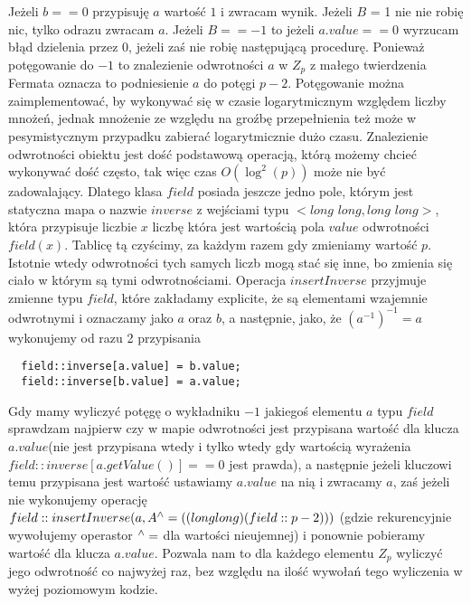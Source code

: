 \documentclass{article}
\begin{document}
Jeżeli $b==0$ przypisuję $a$ wartość $1$ i zwracam wynik. Jeżeli $B$ = 1 nie 
nie robię nic, tylko odrazu zwracam $a$. Jeżeli $B==-1$ to jeżeli $a.value==0$ 
wyrzucam błąd dzielenia przez $0$, jeżeli zaś nie robię następującą procedurę.
Ponieważ potęgowanie do $-1$ to znalezienie odwrotności $a$ w $Z_p$
z małego twierdzenia Fermata oznacza to podniesienie $a$ do potęgi 
$p-2$. Potęgowanie można zaimplementować, by wykonywać się w czasie logarytmicznym
względem liczby mnożeń, jednak mnożenie ze względu na groźbę przepełnienia
też może w pesymistycznym przypadku zabierać logarytmicznie dużo czasu.
Znalezienie odwrotności obiektu jest dość podstawową operacją, którą 
możemy chcieć wykonywać dość często, tak więc czas $O(\log ^2(p))$ może
nie być zadowalający. Dlatego klasa $field$ posiada jeszcze jedno pole, którym
jest statyczna mapa o nazwie $inverse$ z wejściami typu $<long$ $long,long$ $long>$, która przypisuje 
liczbie $x$ liczbę która jest wartością pola $value$ odwrotności $field(x)$. Tablicę tą 
czyścimy, za każdym razem gdy zmieniamy wartość $p$. Istotnie wtedy odwrotności
tych samych liczb mogą stać się inne, bo zmienia się ciało w którym są tymi odwrotnościami.
Operacja $insertInverse$ przyjmuje zmienne typu $field$, które zakładamy
explicite, że są elementami wzajemnie odwrotnymi i oznaczamy jako $a$ oraz $b$, 
a następnie, jako, że $(a^{-1})^{-1}=a$ wykonujemy od razu 2 przypisania
\begin{lstlisting}
  field::inverse[a.value] = b.value;
  field::inverse[b.value] = a.value;
\end{lstlisting}
Gdy mamy wyliczyć potęgę o wykładniku $-1$ jakiegoś elementu $a$ typu $field$ sprawdzam 
najpierw czy w mapie odwrotności jest przypisana wartość dla klucza $a.value$(nie jest
przypisana wtedy i tylko wtedy gdy wartością wyrażenia $field::inverse[a.getValue()] == 0$ jest
prawda), a następnie jeżeli kluczowi temu przypisana jest wartość ustawiamy $a.value$ na nią i zwracamy $a$, zaś
jeżeli nie wykonujemy operację $field::insertInverse(a, A\textsuperscript{$\wedge$}=(( long long)(field::p-2)))$
(gdzie rekurencyjnie wywołujemy operastor $\textsuperscript{$\wedge$}=$ dla wartości nieujemnej)
i ponownie pobieramy wartość dla klucza $a.value$. Pozwala nam to dla każdego elementu $Z_p$ wyliczyć
jego odwrotność co najwyżej raz, bez względu na ilość wywołań tego wyliczenia w wyżej poziomowym 
kodzie. 
\end{document}

